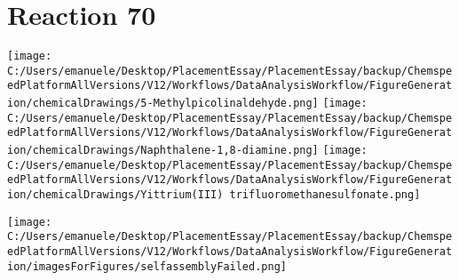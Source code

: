 \documentclass{article}%
\begin{document}
\section*{Reaction 70}%
%
\begin{scheme}[H]%
\begin{minipage}{0.5\textwidth}%
\texttt{[image: C:/Users/emanuele/Desktop/PlacementEssay/PlacementEssay/backup/ChemspeedPlatformAllVersions/V12/Workflows/DataAnalysisWorkflow/FigureGeneration/chemicalDrawings/5-Methylpicolinaldehyde.png]}%
\texttt{[image: C:/Users/emanuele/Desktop/PlacementEssay/PlacementEssay/backup/ChemspeedPlatformAllVersions/V12/Workflows/DataAnalysisWorkflow/FigureGeneration/chemicalDrawings/Naphthalene-1,8-diamine.png]}%
\texttt{[image: C:/Users/emanuele/Desktop/PlacementEssay/PlacementEssay/backup/ChemspeedPlatformAllVersions/V12/Workflows/DataAnalysisWorkflow/FigureGeneration/chemicalDrawings/Yittrium(III) trifluoromethanesulfonate.png]}%
\end{minipage}%
\begin{minipage}{0.5\textwidth}%
\begin{center}%
\texttt{[image: C:/Users/emanuele/Desktop/PlacementEssay/PlacementEssay/backup/ChemspeedPlatformAllVersions/V12/Workflows/DataAnalysisWorkflow/FigureGeneration/imagesForFigures/selfassemblyFailed.png]}%
\end{center}%
\end{minipage}%
\caption{Self-assembly of components 3, 21, with Yittrium(III) in a 3.0:1.5:1.0 molar ratio in CH$_3$CN at 60\textdegree C for 40h. These are the reagents (starting materials) for reaction 70.}%
\end{scheme}%
\end{document}
